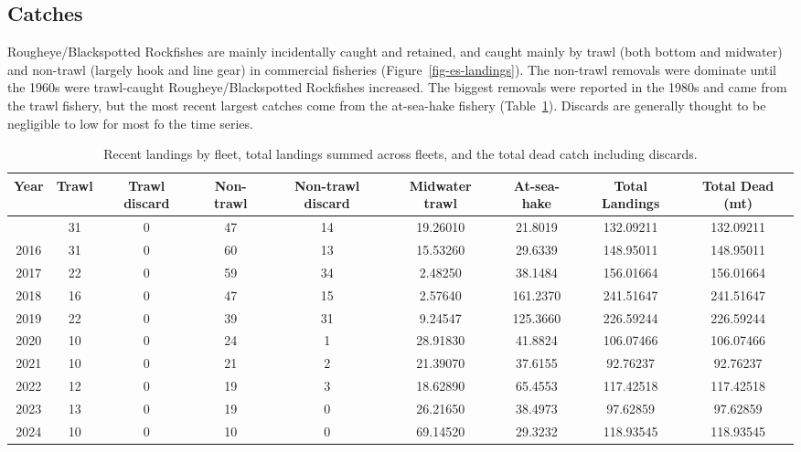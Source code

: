 \documentclass[
]{scrartcl}
\begin{document}
\subsection{Catches}\label{catches}

Rougheye/Blackspotted Rockfishes are mainly incidentally caught and
retained, and caught mainly by trawl (both bottom and midwater) and
non-trawl (largely hook and line gear) in commercial fisheries
(Figure~\ref{fig-es-landings}). The non-trawl removals were dominate
until the 1960s were trawl-caught Rougheye/Blackspotted Rockfishes
increased. The biggest removals were reported in the 1980s and came from
the trawl fishery, but the most recent largest catches come from the
at-sea-hake fishery (Table~\ref{tbl-es-catches}). Discards are generally
thought to be negligible to low for most fo the time series.

\begingroup
\fontsize{7.5pt}{9.0pt}\selectfont

\begin{longtable}{ccccccccc}

\caption{\label{tbl-es-catches}Recent landings by fleet, total landings
summed across fleets, and the total dead catch including discards.}

\tabularnewline

\toprule
Year & Trawl & Trawl 
 discard & Non-trawl & Non-trawl 
 discard & Midwater 
 trawl & At-sea-hake & Total Landings & Total Dead (mt) \\ 
\midrule\addlinespace[2.5pt]
2015 & 31 & 0 & 47 & 14 & 19.26010 & 21.8019 & 132.09211 & 132.09211 \\ 
2016 & 31 & 0 & 60 & 13 & 15.53260 & 29.6339 & 148.95011 & 148.95011 \\ 
2017 & 22 & 0 & 59 & 34 & 2.48250 & 38.1484 & 156.01664 & 156.01664 \\ 
2018 & 16 & 0 & 47 & 15 & 2.57640 & 161.2370 & 241.51647 & 241.51647 \\ 
2019 & 22 & 0 & 39 & 31 & 9.24547 & 125.3660 & 226.59244 & 226.59244 \\ 
2020 & 10 & 0 & 24 & 1 & 28.91830 & 41.8824 & 106.07466 & 106.07466 \\ 
2021 & 10 & 0 & 21 & 2 & 21.39070 & 37.6155 & 92.76237 & 92.76237 \\ 
2022 & 12 & 0 & 19 & 3 & 18.62890 & 65.4553 & 117.42518 & 117.42518 \\ 
2023 & 13 & 0 & 19 & 0 & 26.21650 & 38.4973 & 97.62859 & 97.62859 \\ 
2024 & 10 & 0 & 10 & 0 & 69.14520 & 29.3232 & 118.93545 & 118.93545 \\ 
\bottomrule

\end{longtable}
\end{document}
